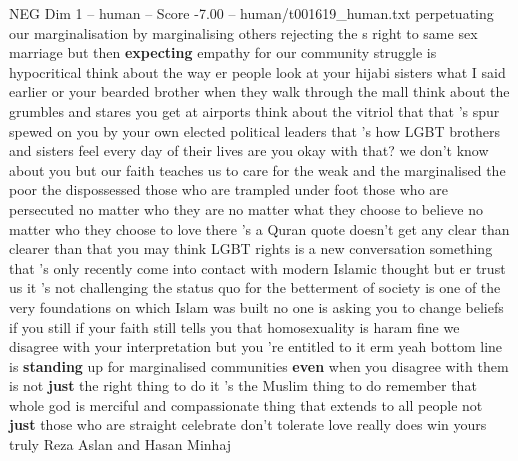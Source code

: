 \begin{textsample}{NEG Dim 1 – human – Score -7.00 – human/t001619\_human.txt}
perpetuating our marginalisation by marginalising others rejecting the s right to same sex marriage but then \textbf{expecting} empathy for our community struggle is hypocritical think about the way er people look at your hijabi sisters what I said earlier or your bearded brother when they walk through the mall think about the grumbles and stares you get at airports think about the vitriol that that 's spur spewed on you by your own elected political leaders that 's how LGBT brothers and sisters feel every day of their lives are you okay with that? we don't know about you but our faith teaches us to care for the weak and the marginalised the poor the dispossessed those who are trampled under foot those who are persecuted no matter who they are no matter what they choose to believe no matter who they choose to love there 's a Quran quote doesn't get any clear than clearer than that you may think LGBT rights is a new conversation something that 's only recently come into contact with modern Islamic thought but er trust us it 's not challenging the status quo for the betterment of society is one of the very foundations on which Islam was built no one is asking you to change beliefs if you still if your faith still tells you that homosexuality is haram fine we disagree with your interpretation but you 're entitled to it erm yeah bottom line is \textbf{standing} up for marginalised communities \textbf{even} when you disagree with them is not \textbf{just} the right thing to do it 's the Muslim thing to do remember that whole god is merciful and compassionate thing that extends to all people not \textbf{just} those who are straight celebrate don't tolerate love really does win yours truly Reza Aslan and Hasan Minhaj

\end{textsample}
